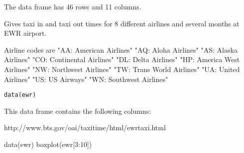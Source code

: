 \begin{Description}\relax
The  data frame has 46 rows and 11 columns.

Gives taxi in and taxi out times for 8 different airlines and several
months at EWR airport.

Airline codes are
"AA: American Airlines"
"AQ: Aloha Airlines"
"AS: Alaska Airlines"
"CO: Continental Airlines"
"DL: Delta Airlines"
"HP: America West Airlines"
"NW: Northwest Airlines"
"TW: Trans World Airlines"
"UA: United Airlines"
"US: US Airways"
"WN: Southwest Airlines"
\end{Description}
\begin{Usage}
\begin{verbatim}data(ewr)\end{verbatim}
\end{Usage}
\begin{Format}\relax
This data frame contains the following columns:
\end{Format}
\begin{Source}\relax
http://www.bts.gov/oai/taxitime/html/ewrtaxi.html
\end{Source}
\begin{Examples}
\begin{ExampleCode}
data(ewr)
boxplot(ewr[3:10])
\end{ExampleCode}
\end{Examples}

